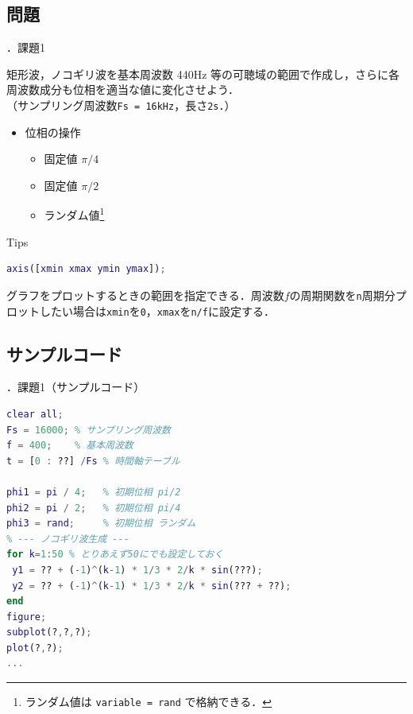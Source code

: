 \documentclass[aspectratio=43]{beamer}
\newcommand{\showsec}{\thesection ．}
\begin{document}
\subsection{問題}
\begin{frame}[t,containsverbatim]{\showsec 課題1}
    \begin{exampleblock}{}
        矩形波，ノコギリ波を基本周波数 440Hz 等の可聴域の範囲で作成し，さらに各周波数成分も位相を適当な値に変化させよう．\\
        （サンプリング周波数\verb|Fs = 16kHz|，長さ\verb|2s|．）
        \begin{itemize}
            \item 位相の操作
                  \begin{itemize}
                      \item 固定値 \(\pi/4\)
                      \item 固定値 \(\pi/2\)
                      \item ランダム値\footnote{ランダム値は \texttt{variable = rand} で格納できる．}
                  \end{itemize}
        \end{itemize}
    \end{exampleblock}
    \begin{block}{Tips}
        \begin{lstlisting}[language={Matlab},numbers={none},frame={none},xleftmargin=0em]
axis([xmin xmax ymin ymax]);
        \end{lstlisting}
        グラフをプロットするときの範囲を指定できる．周波数\(f\)の周期関数を\texttt{n}周期分プロットしたい場合は\texttt{xmin}を\texttt{0}，\texttt{xmax}を\texttt{n/f}に設定する．
    \end{block}
\end{frame}
\subsection{サンプルコード}
\begin{frame}[t,containsverbatim]{\showsec 課題1（サンプルコード）}
    \begin{lstlisting}[language={Matlab}]
clear all;
Fs = 16000; % サンプリング周波数
f = 400;    % 基本周波数
t = [0 : ??] /Fs % 時間軸テーブル

phi1 = pi / 4;   % 初期位相 pi/2
phi2 = pi / 2;   % 初期位相 pi/4
phi3 = rand;     % 初期位相 ランダム
% --- ノコギリ波生成 ---
for k=1:50 % とりあえず50にでも設定しておく
 y1 = ?? + (-1)^(k-1) * 1/3 * 2/k * sin(???);
 y2 = ?? + (-1)^(k-1) * 1/3 * 2/k * sin(??? + ??);
end
figure;
subplot(?,?,?);
plot(?,?);
...
\end{lstlisting}
\end{frame}
\end{document}
